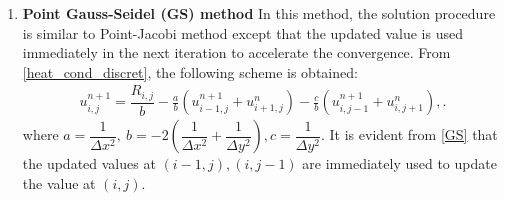 \documentclass[11pt]{report}
\begin{document}
\begin{enumerate}
\item \textbf{Point Gauss-Seidel (GS) method}
In this method, the solution procedure is similar to Point-Jacobi method except that the updated 
value is used immediately in the next iteration to accelerate the convergence. From \eqref{heat_cond_discret}, the following 
scheme is obtained:
\begin{align}
u^{n+1}_{i,j}=\dfrac{R_{i,j}}{b}-\frac{a}{b}(u^{n+1}_{i-1,j}+u^{n}_{i+1,j})-\frac{c}{b}(u^{n+1}_{i,j-1}+u^{n}_{i,j+1}),. \label{GS}
\end{align}
where $a=\dfrac{1}{\Delta x^2}, \ b=-2\left(\dfrac{1}{\Delta x^2}+\dfrac{1}{\Delta y^2}\right), c=\dfrac{1}{\Delta y^2}$. It is evident from \eqref{GS} that the updated values at $(i-1,j),(i,j-1)$ are immediately used to update the value at $(i,j)$. 


\end{enumerate}
\end{document}
